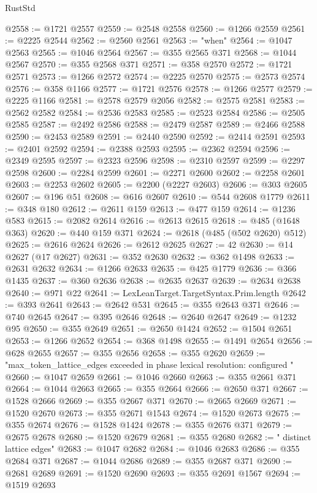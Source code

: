 \begin{lexlean}{RustStd}
\begin{coremodule}
@2558 := @1721 @2557
@2559 := @2548 @2558
@2560 := @1266 @2559
@2561 := @2225 @2544
@2562 := @2560 @2561
@2563 := "when"
@2564 := @1047 @2563
@2565 := @1046 @2564
@2567 := @355 @2565 @371
@2568 := @1044 @2567
@2570 := @355 @2568 @371
@2571 := @358 @2570
@2572 := @1721 @2571
@2573 := @1266 @2572
@2574 := @2225 @2570
@2575 := @2573 @2574
@2576 := @358 @1166
@2577 := @1721 @2576
@2578 := @1266 @2577
@2579 := @2225 @1166
@2581 := @2578 @2579 @2056
@2582 := @2575 @2581
@2583 := @2562 @2582
@2584 := @2536 @2583
@2585 := @2523 @2584
@2586 := @2505 @2585
@2587 := @2492 @2586
@2588 := @2479 @2587
@2589 := @2466 @2588
@2590 := @2453 @2589
@2591 := @2440 @2590
@2592 := @2414 @2591
@2593 := @2401 @2592
@2594 := @2388 @2593
@2595 := @2362 @2594
@2596 := @2349 @2595
@2597 := @2323 @2596
@2598 := @2310 @2597
@2599 := @2297 @2598
@2600 := @2284 @2599
@2601 := @2271 @2600
@2602 := @2258 @2601
@2603 := @2253 @2602
@2605 := @2200 (@2227 @2603)
@2606 := @303 @2605
@2607 := @196 @51
@2608 := @616 @2607
@2610 := @544 @2608 @1779
@2611 := @348 @180
@2612 := @2611 @159
@2613 := @477 @159
@2614 := @1236 @583
@2615 := @2082 @2614
@2616 := @2613 @2615
@2618 := @485 (@1648 @363)
@2620 := @440 @159 @371
@2624 := @2618 (@485 (@502 @2620) @512)
@2625 := @2616 @2624
@2626 := @2612 @2625
@2627 := 42
@2630 := @14 @2627 (@17 @2627)
@2631 := @352 @2630
@2632 := @362 @1498
@2633 := @2631 @2632
@2634 := @1266 @2633
@2635 := @425 @1779
@2636 := @366 @1435
@2637 := @360 @2636
@2638 := @2635 @2637
@2639 := @2634 @2638
@2640 := @971 @22
@2641 := LexLeanTarget.TargetSyntax.Prim.length
@2642 := @393 @2641
@2643 := @2642 @531
@2645 := @355 @2643 @371
@2646 := @740 @2645
@2647 := @395 @2646
@2648 := @2640 @2647
@2649 := @1232 @95
@2650 := @355 @2649
@2651 := @2650 @1424
@2652 := @1504 @2651
@2653 := @1266 @2652
@2654 := @368 @1498
@2655 := @1491 @2654
@2656 := @628 @2655
@2657 := @355 @2656
@2658 := @355 @2620
@2659 := "max_token_lattice_edges exceeded in phase lexical resolution: configured "
@2660 := @1047 @2659
@2661 := @1046 @2660
@2663 := @355 @2661 @371
@2664 := @1044 @2663
@2665 := @355 @2664
@2666 := @2650 @371
@2667 := @1528 @2666
@2669 := @355 @2667 @371
@2670 := @2665 @2669
@2671 := @1520 @2670
@2673 := @355 @2671 @1543
@2674 := @1520 @2673
@2675 := @355 @2674
@2676 := @1528 @1424
@2678 := @355 @2676 @371
@2679 := @2675 @2678
@2680 := @1520 @2679
@2681 := @355 @2680
@2682 := " distinct lattice edges"
@2683 := @1047 @2682
@2684 := @1046 @2683
@2686 := @355 @2684 @371
@2687 := @1044 @2686
@2689 := @355 @2687 @371
@2690 := @2681 @2689
@2691 := @1520 @2690
@2693 := @355 @2691 @1567
@2694 := @1519 @2693

\end{coremodule}
\end{lexlean}

